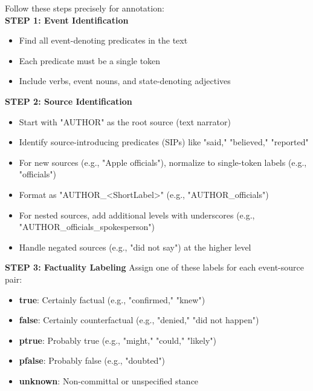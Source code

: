 \begin{figure*}[!ht]
\begin{tcolorbox}[
    width=\textwidth,
    colback=white,
    colframe=black,
    arc=4mm,
    boxrule=0.5pt,
    left=2mm,
    right=2mm,
    top=2mm,
    bottom=2mm,
    fonttitle=\bfseries,
    ]
\begin{tcolorbox}[
    colback=Periwinkle!20,
    boxrule=0pt,
    colframe=white,
    left=0pt,
    right=0pt,
    top=0pt,
    bottom=0pt,
    ]
\small
Follow these steps precisely for annotation:\\

\textbf{STEP 1: Event Identification}
\begin{itemize}[noitemsep, leftmargin=15pt, topsep=0pt]
    \item Find all event-denoting predicates in the text
    \item Each predicate must be a single token
    \item Include verbs, event nouns, and state-denoting adjectives
\end{itemize}

\textbf{STEP 2: Source Identification}
\begin{itemize}[noitemsep, leftmargin=15pt, topsep=0pt]
    \item Start with "AUTHOR" as the root source (text narrator)
    \item Identify source-introducing predicates (SIPs) like "said," "believed," "reported"
    \item For new sources (e.g., "Apple officials"), normalize to single-token labels (e.g., "officials")
    \item Format as "AUTHOR\_<ShortLabel>" (e.g., "AUTHOR\_officials")
    \item For nested sources, add additional levels with underscores (e.g., "AUTHOR\_officials\_spokesperson")
    \item Handle negated sources (e.g., "did not say") at the higher level
\end{itemize}

\textbf{STEP 3: Factuality Labeling}
Assign one of these labels for each event-source pair:
\begin{itemize}[noitemsep, leftmargin=15pt, topsep=0pt]
    \item \textbf{true}: Certainly factual (e.g., "confirmed," "knew")
    \item \textbf{false}: Certainly counterfactual (e.g., "denied," "did not happen")
    \item \textbf{ptrue}: Probably true (e.g., "might," "could," "likely")
    \item \textbf{pfalse}: Probably false (e.g., "doubted")
    \item \textbf{unknown}: Non-committal or unspecified stance
\end{itemize}


\end{tcolorbox}
\end{tcolorbox}
\end{figure*}

